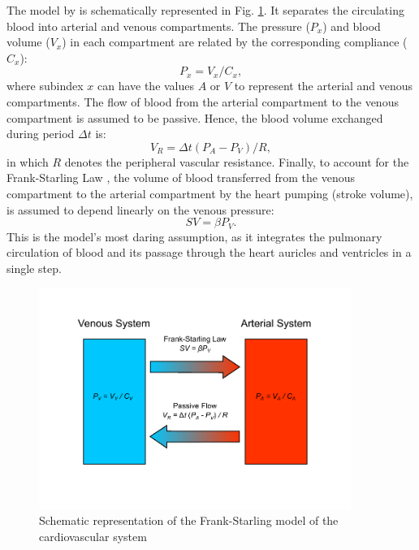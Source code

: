 \documentclass[%
preprint,
 amsmath,amssymb,
 aps,
]{revtex4-2}
\begin{document}
The model by \citeauthor{Upton_2005} is schematically represented in Fig. \ref{fig:model}. It separates the circulating blood into arterial and venous compartments. The pressure ($P_x$) and blood volume ($V_x$) in each compartment are related by the corresponding compliance ($C_x$):
\[
    P_x = V_x / C_x,
\] 
where subindex $x$ can have the values $A$ or $V$ to represent the arterial and venous compartments. The flow of blood from the arterial compartment to the venous compartment is assumed to be passive. Hence, the blood volume exchanged during period $\Delta t$ is:
\[
    V_R = \Delta t (P_A - P_V) / R,
\]
in which $R$ denotes the peripheral vascular resistance. Finally, to account for the Frank-Starling Law \citep{Jacob_1992}, the volume of blood transferred from the venous compartment to the arterial compartment by the heart pumping (stroke volume), is assumed to depend linearly on the venous pressure:
\[
    SV = \beta P_V.
\]
This is the model's most daring assumption, as it integrates the pulmonary circulation of blood and its passage through the heart auricles and ventricles in a single step.

\begin{figure}
\includegraphics[width=4in]{model.pdf}
\caption{Schematic representation of the Frank-Starling model of the cardiovascular system}
\label{fig:model}
\end{figure}
\end{document}
